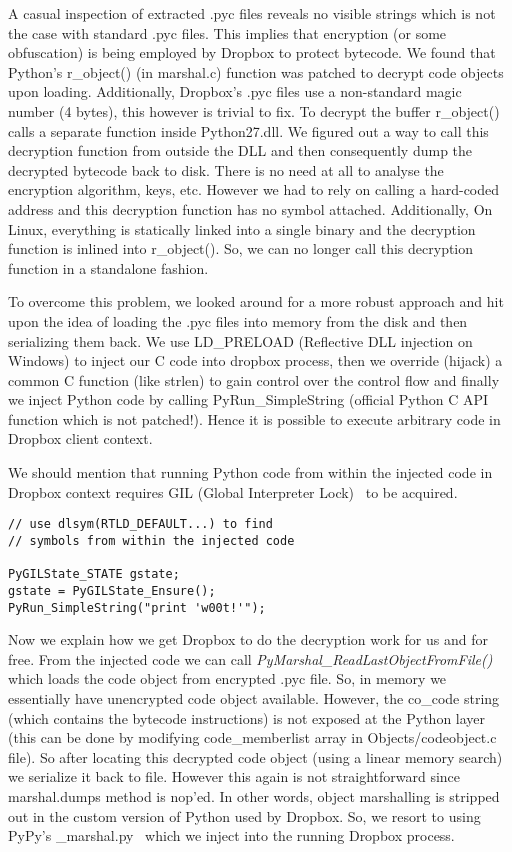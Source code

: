 \documentclass[letterpaper,twocolumn,10pt]{article}
\begin{document}
A casual inspection of extracted .pyc files reveals no visible strings which is
not the case with standard .pyc files. This implies that encryption (or some
obfuscation) is being employed by Dropbox to protect bytecode. We found that
Python’s r\_object() (in marshal.c) function was patched to decrypt code
objects upon loading. Additionally, Dropbox's .pyc files use a non-standard
magic number (4 bytes), this however is trivial to fix. To decrypt the buffer
r\_object() calls a separate function inside Python27.dll. We figured out a way
to call this decryption function from outside the DLL and then consequently
dump the decrypted bytecode back to disk. There is no need at all to analyse
the encryption algorithm, keys, etc. However we had to rely on calling a
hard-coded address and this decryption function has no symbol attached.
Additionally, On Linux, everything is statically linked into a single binary
and the decryption function is inlined into r\_object(). So, we can no longer
call this decryption function in a standalone fashion.

To overcome this problem, we looked around for a more robust approach and hit
upon the idea of loading the .pyc files into memory from the disk and then
serializing them back. We use LD\_PRELOAD (Reflective DLL injection on Windows)
to inject our C code into dropbox process, then we override (hijack) a common C
function (like strlen) to gain control over the control flow and finally we
inject Python code by calling PyRun\_SimpleString (official Python C API
function which is not patched!). Hence it is possible to execute arbitrary
code in Dropbox client context.

We should mention that running Python code from within the injected code in
Dropbox context requires GIL (Global Interpreter Lock)~\cite{GIL} to be
acquired.

\begin{verbatim}
// use dlsym(RTLD_DEFAULT...) to find
// symbols from within the injected code

PyGILState_STATE gstate;
gstate = PyGILState_Ensure();
PyRun_SimpleString("print 'w00t!'");
\end{verbatim}

Now we explain how we get Dropbox to do the decryption work for us and for
free. From the injected code we can call
\emph{PyMarshal\_ReadLastObjectFromFile()} which loads the code object from
encrypted .pyc file. So, in memory we essentially have unencrypted code object
available. However, the co\_code string (which contains the bytecode
instructions) is not exposed at the Python layer (this can be done by modifying
code\_memberlist array in Objects/codeobject.c file). So after locating this
decrypted code object (using a linear memory search) we serialize it back to
file. However this again is not straightforward since marshal.dumps method is
nop'ed. In other words, object marshalling is stripped out in the custom
version of Python used by Dropbox.  So, we resort to using PyPy’s
\_marshal.py~\cite{PyPy} which we inject into the running Dropbox process.
\end{document}
